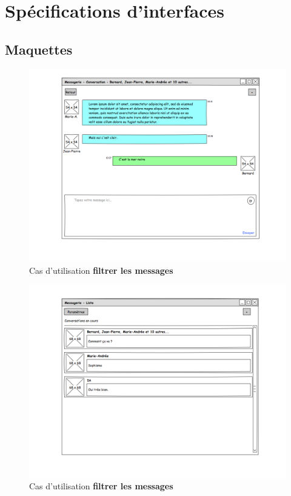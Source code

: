 \documentclass[11pt,dvipsnames,svgnames]{report}
\begin{document}
\section{Spécifications d'interfaces}
\subsection{Maquettes}
\begin{center}
\begin{figure}
\includegraphics[width=\textwidth]{maquette/maquette1.png}
\caption{Cas d'utilisation \textbf{filtrer les messages}}
\end{figure}

\begin{figure}
\includegraphics[width=\textwidth]{maquette/maquette2.png}
\caption{Cas d'utilisation \textbf{filtrer les messages}}
\end{figure}


\end{center}
\end{document}
